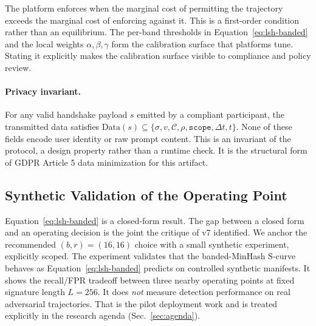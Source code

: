 \documentclass[11pt]{article}
\begin{document}
The platform enforces when the marginal cost of permitting the trajectory exceeds the marginal cost of enforcing against it. This is a first-order condition rather than an equilibrium. The per-band thresholds in Equation~\eqref{eq:lsh-banded} and the local weights $\alpha, \beta, \gamma$ form the calibration surface that platforms tune. Stating it explicitly makes the calibration surface visible to compliance and policy review.

\paragraph{Privacy invariant.} For any valid handshake payload $s$ emitted by a compliant participant, the transmitted data satisfies $\text{Data}(s) \subseteq \{\sigma, v, \mathcal{C}, \rho, \texttt{scope}, \Delta t, t\}$. None of these fields encode user identity or raw prompt content. This is an invariant of the protocol, a design property rather than a runtime check. It is the structural form of GDPR Article 5 data minimization for this artifact.

\subsection{Synthetic Validation of the Operating Point}
\label{sec:synthetic}

Equation~\eqref{eq:lsh-banded} is a closed-form result. The gap between a closed form and an operating decision is the joint the critique of v7 identified. We anchor the recommended $(b, r) = (16, 16)$ choice with a small synthetic experiment, explicitly scoped. The experiment validates that the banded-MinHash S-curve behaves as Equation~\eqref{eq:lsh-banded} predicts on controlled synthetic manifests. It shows the recall/FPR tradeoff between three nearby operating points at fixed signature length $L=256$. It does \emph{not} measure detection performance on real adversarial trajectories. That is the pilot deployment work and is treated explicitly in the research agenda (Sec.~\ref{sec:agenda}).
\end{document}
